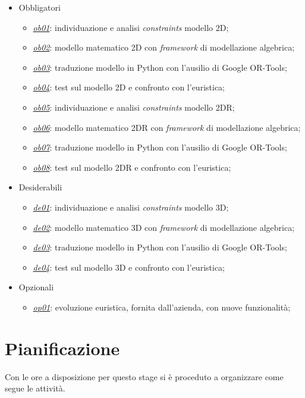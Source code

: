 \begin{itemize}
	\item Obbligatori
	      \begin{itemize}
	      	\item \underline{\textit{ob01}}: individuazione e analisi \textit{constraints} modello 2D;
	      	\item \underline{\textit{ob02}}: modello matematico 2D con \textit{framework} di modellazione algebrica;
	      	\item \underline{\textit{ob03}}: traduzione modello in Python con l'ausilio di Google OR-Tools;
	      	\item \underline{\textit{ob04}}: test sul modello 2D e confronto con l'euristica;
	      	\item \underline{\textit{ob05}}: individuazione e analisi \textit{constraints} modello 2DR; 
	      	\item \underline{\textit{ob06}}: modello matematico 2DR con \textit{framework} di modellazione algebrica;
	      	\item \underline{\textit{ob07}}: traduzione modello in Python con l'ausilio di Google OR-Tools;
	      	\item \underline{\textit{ob08}}: test sul modello 2DR e confronto con l'euristica;
	      \end{itemize}
	\item Desiderabili
	      \begin{itemize}
	      	\item \underline{\textit{de01}}: individuazione e analisi \textit{constraints} modello 3D;
	      	\item \underline{\textit{de02}}: modello matematico 3D con \textit{framework} di modellazione algebrica;
	      	\item \underline{\textit{de03}}: traduzione modello in Python con l'ausilio di Google OR-Tools;
	      	\item \underline{\textit{de04}}: test sul modello 3D e confronto con l'euristica;
	      \end{itemize}
	\item Opzionali
	      \begin{itemize}
	      	\item \underline{\textit{op01}}: evoluzione euristica, fornita dall'azienda, con nuove funzionalità;
	      \end{itemize} 
\end{itemize}
	
\section{Pianificazione}
Con le ore a disposizione per questo stage si è proceduto a organizzare come segue le attività.

